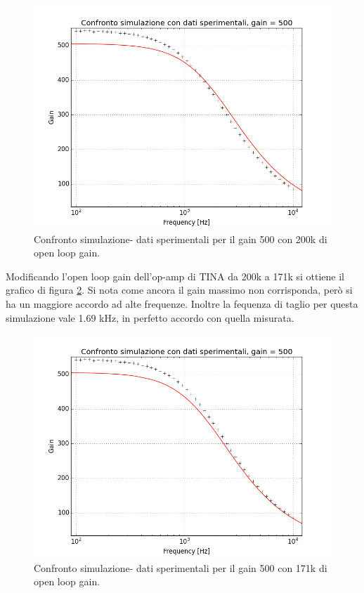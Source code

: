 \documentclass[journal, a4paper]{IEEEtran}
\begin{document}
\begin{figure}[htp]
\includegraphics[scale=.4]{hm4comparisons_nonsim}
\caption{Confronto simulazione- dati sperimentali per il gain 500 con 200k di open loop gain.}
\label{fig:gain500nonsim}
\end{figure}

Modificando l'open loop gain dell'op-amp di TINA da 200k a 171k si ottiene il grafico di figura \ref{fig:gain500sim}. Si nota come ancora il gain massimo non corrisponda, però si ha un maggiore accordo ad alte frequenze. Inoltre la fequenza di taglio per questa simulazione vale 1.69 kHz, in perfetto accordo con quella misurata.\\

\begin{figure}[htp]
\includegraphics[scale=.4]{hm4comparisons_sim}
\caption{Confronto simulazione- dati sperimentali per il gain 500 con 171k di open loop gain.}
\label{fig:gain500sim}
\end{figure}
\end{document}
